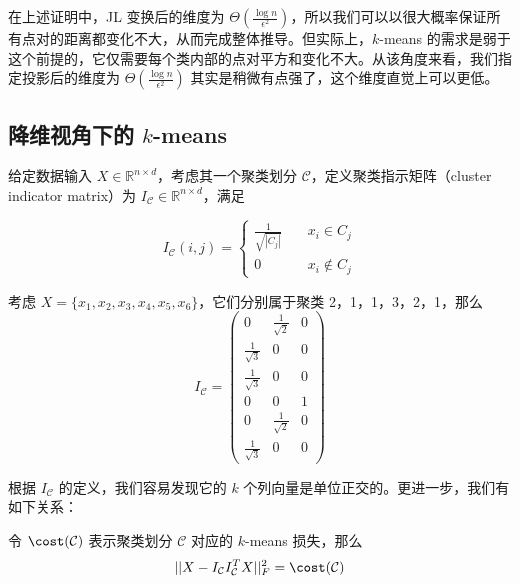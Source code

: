 \documentclass[lang=cn,newtx,10pt,scheme=chinese,chinesefont=nofont,citestyle=gb7714-2015, bibstyle=gb7714-2015]{elegantbook}
\begin{document}
\begin{refsection}
在上述证明中，JL 变换后的维度为 $\Theta(\frac{\log n}{\epsilon^2})$，所以我们可以以很大概率保证所有点对的距离都变化不大，从而完成整体推导。但实际上，$k$-means 的需求是弱于这个前提的，它仅需要每个类内部的点对平方和变化不大。从该角度来看，我们指定投影后的维度为 $\Theta(\frac{\log n}{\epsilon^2})$ 其实是稍微有点强了，这个维度直觉上可以更低。

\subsection{降维视角下的 \texorpdfstring{$k$}{k}-means}

\begin{definition}[聚类指示矩阵]
    给定数据输入 $X\in\mathbb R^{n\times d}$，考虑其一个聚类划分 $\mathcal{C}$，定义聚类指示矩阵（cluster indicator matrix）为 $I_{\mathcal{C}}\in\mathbb R^{n\times d}$，满足

    \begin{equation*}
        I_{\mathcal{C}}(i, j) = \begin{cases}
            \frac{1}{\sqrt{|C_j|}}\quad& x_i\in C_j \\
            0 & x_i\notin C_j
        \end{cases}
    \end{equation*}
\end{definition}

\begin{example}
    考虑 $X=\{x_1,x_2,x_3,x_4,x_5,x_6\}$，它们分别属于聚类 2，1，1，3，2，1，那么
    \begin{equation*}
        I_{\mathcal{C}} = \left(\begin{array}{ccc}
             0 & \frac{1}{\sqrt{2}} & 0 \\
             \frac{1}{\sqrt{3}} & 0 & 0 \\
             \frac{1}{\sqrt{3}} & 0 & 0 \\
             0 & 0 & 1 \\
             0 & \frac{1}{\sqrt{2}} & 0 \\
             \frac{1}{\sqrt{3}} & 0 & 0
        \end{array}\right)
    \end{equation*}
\end{example}

根据 $I_{\mathcal{C}}$ 的定义，我们容易发现它的 $k$ 个列向量是单位正交的。更进一步，我们有如下关系：

\begin{proposition}
    令 $\cost(\mathcal{C})$ 表示聚类划分 $\mathcal{C}$ 对应的 $k$-means 损失，那么
    \begin{equation*}
        ||X-I_{\mathcal{C}}I_{\mathcal{C}}^TX||_F^2 = \cost(\mathcal{C})
    \end{equation*}
\end{proposition}


\end{refsection}
\end{document}
